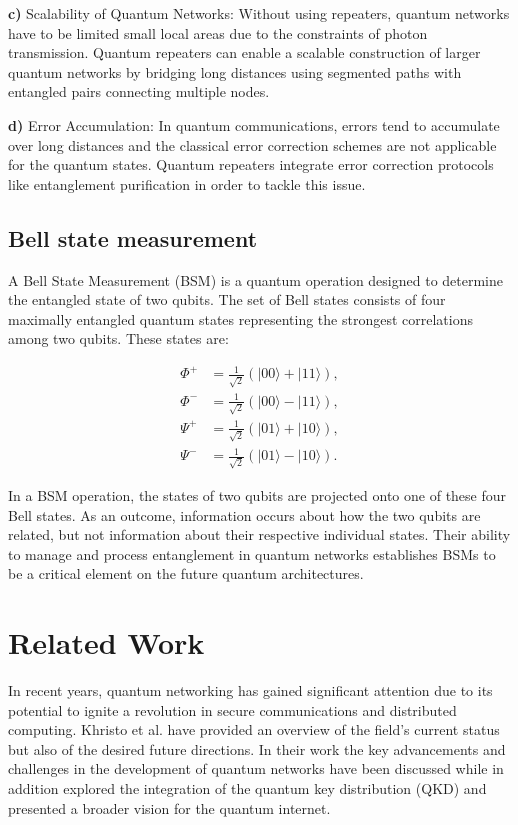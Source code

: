 \documentclass[12pt,a4paper] {report}
\begin{document}
		\textbf{c)} Scalability of Quantum Networks:
		Without using repeaters, quantum networks have to be limited small local areas due to the
		constraints of photon transmission.
		Quantum repeaters can enable a scalable construction 
		of larger quantum networks by bridging long distances using segmented 
		paths with entangled pairs connecting multiple nodes.
		
		\textbf{d)} Error Accumulation:
		In quantum communications, errors tend to accumulate over long distances
		and the classical error correction schemes are not applicable for the quantum states.
		Quantum repeaters integrate error correction protocols like entanglement purification
		in order to tackle this issue.

		\section{Bell state measurement}

		A Bell State Measurement (BSM) is a quantum operation designed to determine
		the entangled state of two qubits. The set of Bell states consists of four 
		maximally entangled quantum states representing the strongest correlations
		among two qubits. These states are:

			\begin{align*}
			    \Phi^+ &= \frac{1}{\sqrt{2}} (|00\rangle + |11\rangle), \\
			    \Phi^- &= \frac{1}{\sqrt{2}} (|00\rangle - |11\rangle), \\
			    \Psi^+ &= \frac{1}{\sqrt{2}} (|01\rangle + |10\rangle), \\
			    \Psi^- &= \frac{1}{\sqrt{2}} (|01\rangle - |10\rangle).
			\end{align*}

		In a BSM operation, the states of two qubits are projected onto one of these four Bell states. 
		As an outcome, information occurs about how the two qubits are related, but not information
		about their respective individual states. Their ability to manage and process entanglement
		in quantum networks establishes BSMs to be a critical element on the future quantum architectures.


\chapter{Related Work}
		In recent years, quantum networking has gained
		significant attention due to its potential to ignite a revolution in
		secure communications and distributed computing.
		Khristo et al. \cite{Khristo2020} have provided an overview of the field's
		current status but also of the desired future directions.
		In their work the key advancements and challenges in the
		development of quantum networks have been discussed while in addition
		explored the integration of the quantum key distribution (QKD)
		and presented a broader vision for the quantum internet.
		
\end{document}
